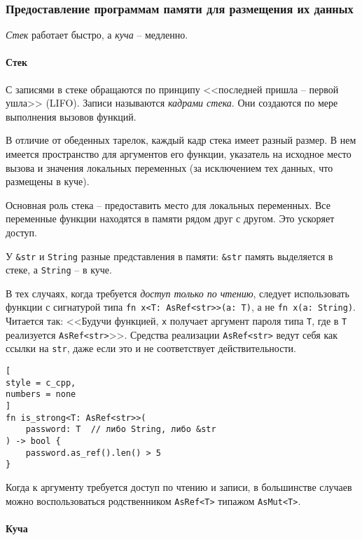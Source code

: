 \documentclass[%
	11pt,
	a4paper,
	utf8,
		]{article}
\begin{document}
\subsubsection{Предоставление программам памяти для размещения их данных}

{\color{blue}\emph{Стек} работает быстро, а \emph{куча} -- медленно.}

\paragraph{Стек}

С записями в стеке обращаются по принципу <<последней пришла -- первой ушла>> (LIFO). Записи называются \emph{кадрами стека}. Они создаются по мере выполнения вызовов функций.

В отличие от обеденных тарелок, каждый кадр стека имеет разный размер. В нем имеется пространство для аргументов его функции, указатель на исходное место вызова и значения локальных переменных (за исключением тех данных, что размещены в куче). 

Основная роль стека -- предоставить место для локальных переменных. Все переменные функции находятся в памяти рядом друг с другом. Это ускоряет доступ.

У \verb|&str| и \verb|String| разные представления в памяти: \verb|&str| память выделяется в стеке, а \verb|String| -- в куче.

В тех случаях, когда требуется \emph{доступ только по чтению}, следует использовать функции с сигнатурой типа \verb|fn x<T: AsRef<str>>(a: T)|, а не \verb|fn x(a: String)|. Читается так: <<Будучи функцией, \verb|x| получает аргумент пароля типа \verb|T|, где в \verb|T| реализуется \verb|AsRef<str>|>>. Средства реализации \verb|AsRef<str>| ведут себя как ссылки на \verb|str|, даже если это и не соответствует действительности.
\begin{lstlisting}[
style = c_cpp,
numbers = none
]
fn is_strong<T: AsRef<str>>(
    password: T  // либо String, либо &str
) -> bool {
    password.as_ref().len() > 5
}
\end{lstlisting}

Когда к аргументу требуется доступ по чтению и записи, в большинстве случаев можно воспользоваться родственником \verb|AsRef<T>| типажом \verb|AsMut<T>|. 




\paragraph{Куча}
\end{document}
